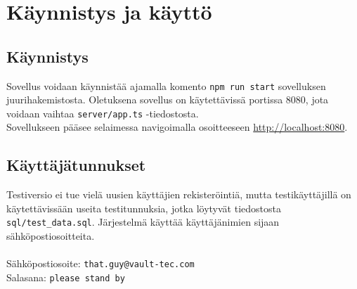 \chapter{Käynnistys ja käyttö}

\section{Käynnistys}

Sovellus voidaan käynnistää ajamalla komento \texttt{npm run start} sovelluksen juurihakemistosta. Oletuksena sovellus on käytettävissä portissa 8080, jota voidaan vaihtaa \texttt{server/app.ts} -tiedostosta.\\

Sovellukseen pääsee selaimessa navigoimalla osoitteeseen \href{http://localhost:8080}{http://localhost:8080}.

\section{Käyttäjätunnukset}

Testiversio ei tue vielä uusien käyttäjien rekisteröintiä, mutta testikäyttäjillä on käytettävissään useita testitunnuksia, jotka löytyvät tiedostosta \texttt{sql/test\_data.sql}. Järjestelmä käyttää käyttäjänimien sijaan sähköpostiosoitteita.\\
\\
\noindent
Sähköpostiosoite: \texttt{that.guy@vault-tec.com} \\
Salasana: \texttt{please stand by}